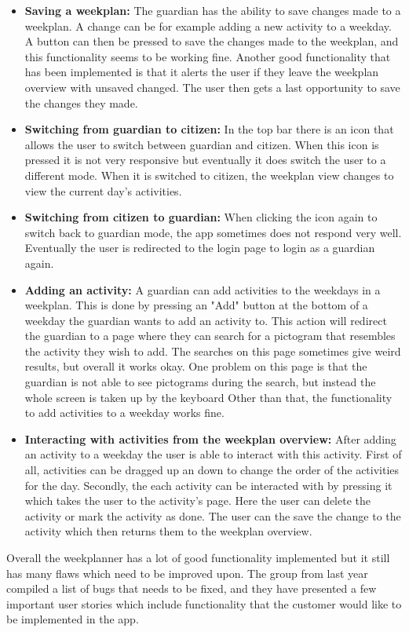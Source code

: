 \begin{itemize}
    \\
    \item \textbf{Saving a weekplan:} The guardian has the ability to save changes made to a weekplan. A change can be for example adding a new activity to a weekday.
    A button can then be pressed to save the changes made to the weekplan, and this functionality seems to be working fine.
    Another good functionality that has been implemented is that it alerts the user if they leave the weekplan overview with unsaved changed. The user then gets a last opportunity to save the changes they made.
    \\
    \item \textbf{Switching from guardian to citizen:} In the top bar there is an icon that allows the user to switch between guardian and citizen.
    When this icon is pressed it is not very responsive but eventually it does switch the user to a different mode.
    When it is switched to citizen, the weekplan view changes to view the current day's activities.
    \\
    \item \textbf{Switching from citizen to guardian:} When clicking the icon again to switch back to guardian mode, the app sometimes does not respond very well.
    Eventually the user is redirected to the login page to login as a guardian again.
    \\
    \item \textbf{Adding an activity:} A guardian can add activities to the weekdays in a weekplan. This is done by pressing an "Add" button at the bottom of a weekday the guardian wants to add an activity to.
    This action will redirect the guardian to a page where they can search for a pictogram that resembles the activity they wish to add. The searches on this page sometimes give weird results, but overall it works okay.
    One problem on this page is that the guardian is not able to see pictograms during the search, but instead the whole screen is taken up by the keyboard
    Other than that, the functionality to add activities to a weekday works fine.
    \\
    \item \textbf{Interacting with activities from the weekplan overview:} After adding an activity to a weekday the user is able to interact with this activity.
    First of all, activities can be dragged up an down to change the order of the activities for the day.
    Secondly, the each activity can be interacted with by pressing it which takes the user to the activity's page.
    Here the user can delete the activity or mark the activity as done. The user can the save the change to the activity which then returns them to the weekplan overview.
    \\
\end{itemize}
Overall the weekplanner has a lot of good functionality implemented but it still has many flaws which need to be improved upon.
The group from last year compiled a list of bugs that needs to be fixed, and they have presented a few important user stories which include functionality that the customer would like to be implemented in the app.